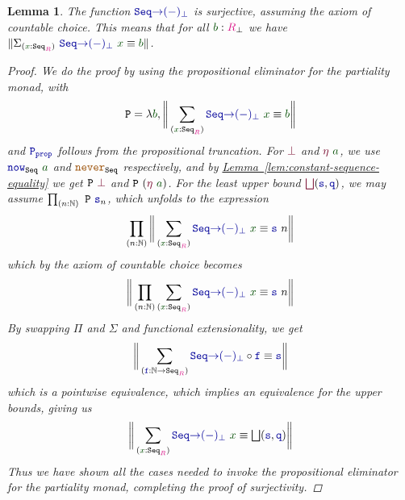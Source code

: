 \documentclass[twoside,11pt,openright]{report}
\theoremstyle{plain} %
\newtheorem{lem}[thm]{Lemma}
\theoremstyle{definition}
\theoremstyle{remark}
\newcommand*{\lemref}[1]{\hyperref[lem:#1]{Lemma~\ref*{lem:#1}}}
\newcommand*{\term}[1]{\textcolor{green!30!black}{#1}} %
\newcommand*{\type}[1]{\textcolor{magenta!90!black}{#1}}
\newcommand*{\constant}[1]{\textcolor{orange!60!black}{\ensuremath{\mathtt{#1}}}}
\newcommand*{\function}[1]{\textcolor{blue!60!black}{\ensuremath{\mathtt{#1}}}}
\newcommand*{\constructor}[1]{\textcolor{purple!60!black}{\ensuremath{\mathtt{#1}}}}
\newcommand*{\typeformer}[1]{\ensuremath{\mathtt{#1}}}
\begin{document}
\begin{lem}
  The function \(\function{Seq{\rightarrow}(-)_{\bot}}\) is surjective, assuming the axiom of countable choice. This means that for all \(\term{b} : \type{R}_{\bot}\) we have \(\| \Sigma_{(\term{x} : \typeformer{Seq}_{\type{R}})}~\function{Seq{\rightarrow}(-)_{\bot}}~\term{x} \equiv \term{b} \|\).
  \begin{proof}
    We do the proof by using the propositional eliminator for the partiality monad, with
    \begin{equation}
      \typeformer{P} = \lambda \term{b}, \bigg\| \sum_{(\term{x} : \typeformer{Seq}_{\type{R}})} \function{Seq{\rightarrow}(-)_{\bot}}~\term{x} \equiv \term{b} \bigg\|
    \end{equation}
    and \(\function{P_{prop}}\) follows from the propositional truncation. For \(\constructor{\bot}\) and \(\constructor{\eta}~\term{a}\), we use \(\function{now}_{\typeformer{Seq}}~\term{a}\) and \(\constant{never}_{\typeformer{Seq}}\) respectively, and by \lemref{constant-sequence-equality} we get \(\typeformer{P}~\constructor{\bot}\) and \(\typeformer{P}~(\constructor{\eta}~\term{a})\). For the least upper bound \(\constructor{\bigsqcup} (\function{s},\function{q})\), we may assume \(\prod_{(n : \mathbb{N})}~\typeformer{P}~\function{s}_n\), which unfolds to the expression
    \begin{equation}
    \prod_{(n : \mathbb{N})} \bigg\| \sum_{(\term{x} : \typeformer{Seq}_{\type{R}})} \function{Seq{\rightarrow}(-)_{\bot}}~\term{x} \equiv \function{s}~n \bigg\|
  \end{equation}
  which by the axiom of countable choice becomes
  \begin{equation}
    \bigg\| \prod_{(n : \mathbb{N})} \sum_{(\term{x} : \typeformer{Seq}_{\type{R}})} \function{Seq{\rightarrow}(-)_{\bot}}~\term{x} \equiv \function{s}~n \bigg\|
  \end{equation}
  By swapping \(\Pi\) and \(\Sigma\) and functional extensionality, we get
    \begin{equation}
    \bigg\| \sum_{(\function{f} : \mathbb{N} \rightarrow \typeformer{Seq}_{\type{R}})} \function{Seq{\rightarrow}(-)_{\bot}} \circ \function{f} \equiv \function{s} \bigg\|
  \end{equation}
  which is a pointwise equivalence, which implies an equivalence for the upper bounds, giving us
  \begin{equation}
    \bigg\| \sum_{(\term{x} : \typeformer{Seq}_{\type{R}})} \function{Seq{\rightarrow}(-)_{\bot}}~\term{x} \equiv {\textstyle{\bigsqcup}}(\function{s},\function{q}) \bigg\|
  \end{equation}
  Thus we have shown all the cases needed to invoke the propositional eliminator for the partiality monad, completing the proof of surjectivity.
  \end{proof}
\end{lem}
\end{document}
